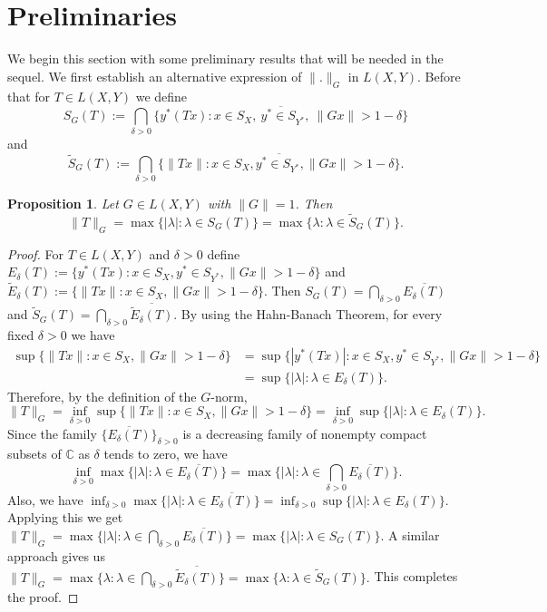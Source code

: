 \documentclass[12pt]{amsart}
\newtheorem{proposition}[theorem]{Proposition}
\theoremstyle{definition}
\numberwithin{equation}{section}
\begin{document}
	\section{Preliminaries}
	We begin this section with some preliminary results that will be needed in the sequel. We first establish an alternative expression of $\|.\|_G$ in $L(X, Y)$. Before that for $T\in L(X, Y)$ we define 
	\[
	S_G(T):=\bigcap_{\delta>0}\overline{\{y^*(Tx): x\in S_X,\ y^*\in S_{Y^*},\ \|Gx\|>1-\delta\}}
	\]
	and 
	\[
	\widetilde{S}_G(T):=\bigcap_{\delta>0}\overline{\{\|Tx\|: x\in S_X, y^*\in S_{Y^*}, \|Gx\|>1-\delta\}}.
	\]
	\begin{proposition}\label{DP1}
		Let $G\in L(X,Y)$ with $\|G\|=1$. Then 
		\[
		\|T\|_G=\max\{|\lambda|:\lambda\in S_G(T)\}=\max\{\lambda:\lambda\in \widetilde{S}_G(T)\}.
		\]
	\end{proposition}
	\begin{proof}
		For $T\in L(X,Y)$ and $\delta>0$ define $E_{\delta}(T):=\bigl\{y^{*}(Tx): x\in S_X, y^{*}\in S_{Y^{*}}, \|Gx\|>1-\delta \bigr\}$ and $\widetilde{E}_{\delta}(T):=\bigl\{\|Tx\|: x\in S_X, \|Gx\|>1-\delta \bigr\}.$ Then $S_G(T)=\bigcap_{\delta>0}\overline{E_{\delta}(T)}$ and $\widetilde{S}_G(T)=\bigcap_{\delta>0}\overline{\widetilde{E}_{\delta}(T)}$. By using the Hahn-Banach Theorem, for every fixed $\delta>0$ we have
		\begin{align*}
			\sup\{\|Tx\|:x\in S_X, \|Gx\|>1-\delta\}&= \sup\{|y^{*}(Tx)|: x\in S_X, y^{*}\in S_{Y^{*}}, \|Gx\|>1-\delta \}\\
			&= \sup\{|\lambda|:\lambda\in E_{\delta}(T)\}.    
		\end{align*}
		Therefore, by the definition of the $G$-norm,
		\[
		\|T\|_{G}=\inf_{\delta>0}\sup\{\|Tx\|:x\in S_X,\|Gx\|>1-\delta\}=\inf_{\delta>0} \sup\{|\lambda|:\lambda\in E_{\delta}(T)\}.
		\]
		Since the family $\{\overline{E_{\delta}(T)}\}_{\delta>0}$ is a decreasing family of nonempty compact subsets of $\mathbb{C}$ as $\delta$ tends to zero, we have 
		\[
		\inf_{\delta>0}\max\{|\lambda|:\lambda\in\overline{E_{\delta}(T)}\}=\max\{|\lambda|:\lambda\in \bigcap_{\delta>0}\overline{E_{\delta}(T)}\}.
		\]
		Also, we have $\inf_{\delta>0}\max\{|\lambda|:\lambda\in\overline{E_{\delta}(T)}\}=\inf_{\delta>0} \sup\{|\lambda|:\lambda\in E_{\delta}(T)\}$. Applying this we get $\|T\|_{G}=\max\{|\lambda|:\lambda\in\bigcap_{\delta>0}\overline{E_{\delta}(T)}\}=\max\{|\lambda|:\lambda\in S_G(T)\}.$ A similar approach gives us $\|T\|_{G}=\max\{\lambda:\lambda\in\bigcap_{\delta>0}\overline{\widetilde{E}_{\delta}(T)}\}=\max\{\lambda:\lambda\in \widetilde{S}_G(T)\}.$ This completes the proof.
	\end{proof}
	
\end{document}

